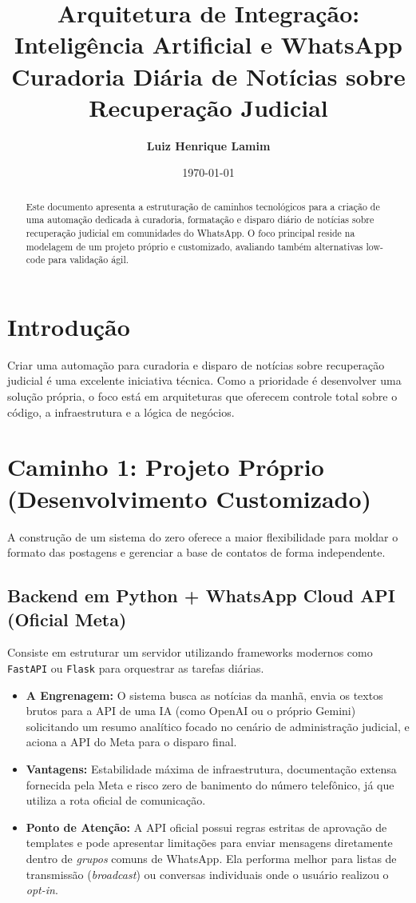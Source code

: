 \documentclass[11pt,a4paper]{article}
\title{\vspace{-1.5cm}\vspace{2cm}\textbf{Arquitetura de Integração: Inteligência Artificial e WhatsApp}\\ \large Curadoria Diária de Notícias sobre Recuperação Judicial}
\author{\textbf{Luiz Henrique Lamim}}
\date{\today}
\begin{document}
\maketitle

\begin{abstract}
Este documento apresenta a estruturação de caminhos tecnológicos para a criação de uma automação dedicada à curadoria, formatação e disparo diário de notícias sobre recuperação judicial em comunidades do WhatsApp. O foco principal reside na modelagem de um projeto próprio e customizado, avaliando também alternativas low-code para validação ágil.
\end{abstract}

\section{Introdução}
Criar uma automação para curadoria e disparo de notícias sobre recuperação judicial é uma excelente iniciativa técnica. Como a prioridade é desenvolver uma solução própria, o foco está em arquiteturas que oferecem controle total sobre o código, a infraestrutura e a lógica de negócios.

\section{Caminho 1: Projeto Próprio (Desenvolvimento Customizado)}
A construção de um sistema do zero oferece a maior flexibilidade para moldar o formato das postagens e gerenciar a base de contatos de forma independente.

\subsection{Backend em Python + WhatsApp Cloud API (Oficial Meta)}
Consiste em estruturar um servidor utilizando frameworks modernos como \texttt{FastAPI} ou \texttt{Flask} para orquestrar as tarefas diárias.
\begin{itemize}[label=\textbullet]
    \item \textbf{A Engrenagem:} O sistema busca as notícias da manhã, envia os textos brutos para a API de uma IA (como OpenAI ou o próprio Gemini) solicitando um resumo analítico focado no cenário de administração judicial, e aciona a API do Meta para o disparo final.
    \item \textbf{Vantagens:} Estabilidade máxima de infraestrutura, documentação extensa fornecida pela Meta e risco zero de banimento do número telefônico, já que utiliza a rota oficial de comunicação.
    \item \textbf{Ponto de Atenção:} A API oficial possui regras estritas de aprovação de templates e pode apresentar limitações para enviar mensagens diretamente dentro de \textit{grupos} comuns de WhatsApp. Ela performa melhor para listas de transmissão (\textit{broadcast}) ou conversas individuais onde o usuário realizou o \textit{opt-in}.
\end{itemize}
\end{document}

